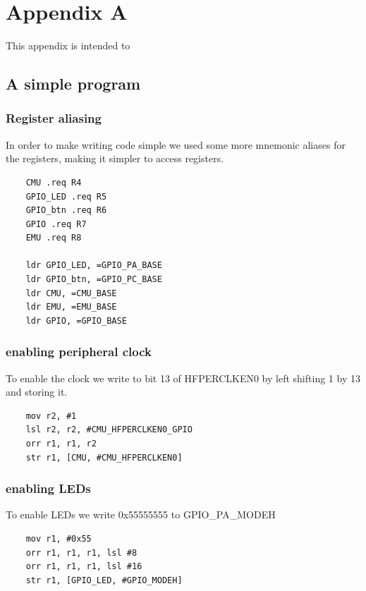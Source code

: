 \chapter{Appendix A}

This appendix is intended to 

\section{A simple program}

\subsection{Register aliasing}

In order to make writing code simple we used some more mnemonic aliases for the registers, making it simpler to access registers.

\begin{lstlisting}
	CMU .req R4
	GPIO_LED .req R5
	GPIO_btn .req R6
	GPIO .req R7
	EMU .req R8
	
	ldr GPIO_LED, =GPIO_PA_BASE
	ldr GPIO_btn, =GPIO_PC_BASE
	ldr CMU, =CMU_BASE
	ldr EMU, =EMU_BASE
	ldr GPIO, =GPIO_BASE
\end{lstlisting}

\subsection{enabling peripheral clock}

To enable the clock we write to bit 13 of HFPERCLKEN0 by left shifting 1 by 13 and storing it.

\begin{lstlisting}
	mov r2, #1
	lsl r2, r2, #CMU_HFPERCLKEN0_GPIO
	orr r1, r1, r2
	str r1, [CMU, #CMU_HFPERCLKEN0]	
\end{lstlisting}

\subsection{enabling LEDs}

To enable LEDs we write 0x55555555 to GPIO\_PA\_MODEH

\begin{lstlisting}
	mov r1, #0x55
	orr r1, r1, r1, lsl #8
	orr r1, r1, r1, lsl #16
	str r1, [GPIO_LED, #GPIO_MODEH]
\end{lstlisting}



